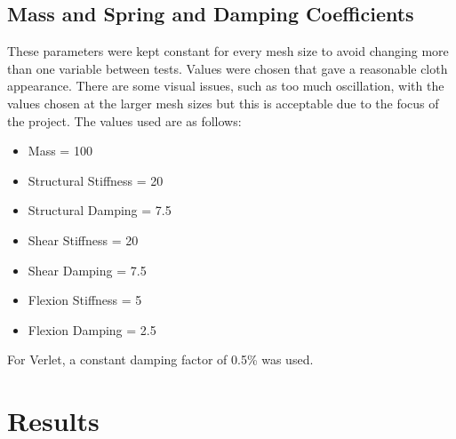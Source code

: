 \subsection{Mass and Spring and Damping Coefficients}
These parameters were kept constant for every mesh size to avoid changing more than one variable between tests. Values were chosen that gave a reasonable cloth appearance. There are some visual issues, such as too much oscillation, with the values chosen at the larger mesh sizes but this is acceptable due to the focus of the project. The values used are as follows:
\begin{itemize}
\item{Mass = 100}
\item{Structural Stiffness = 20}
\item{Structural Damping = 7.5}
\item{Shear Stiffness = 20}
\item{Shear Damping = 7.5}
\item{Flexion Stiffness = 5}
\item{Flexion Damping = 2.5}
\end{itemize}
For Verlet, a constant damping factor of 0.5\% was used.

\section{Results}

